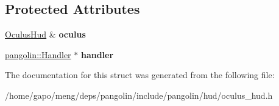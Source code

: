 \subsection*{Protected Attributes}
\begin{DoxyCompactItemize}
\item 
\hyperlink{classpangolin_1_1_oculus_hud}{Oculus\+Hud} \& {\bfseries oculus}\hypertarget{structpangolin_1_1_handler_oculus_aafeb2ac80fbdba7aab168f94482e24fe}{}\label{structpangolin_1_1_handler_oculus_aafeb2ac80fbdba7aab168f94482e24fe}

\item 
\hyperlink{structpangolin_1_1_handler}{pangolin\+::\+Handler} $\ast$ {\bfseries handler}\hypertarget{structpangolin_1_1_handler_oculus_af1f064600230aa2bfff882adec8c0569}{}\label{structpangolin_1_1_handler_oculus_af1f064600230aa2bfff882adec8c0569}

\end{DoxyCompactItemize}


The documentation for this struct was generated from the following file\+:\begin{DoxyCompactItemize}
\item 
/home/gapo/meng/deps/pangolin/include/pangolin/hud/oculus\+\_\+hud.\+h\end{DoxyCompactItemize}

